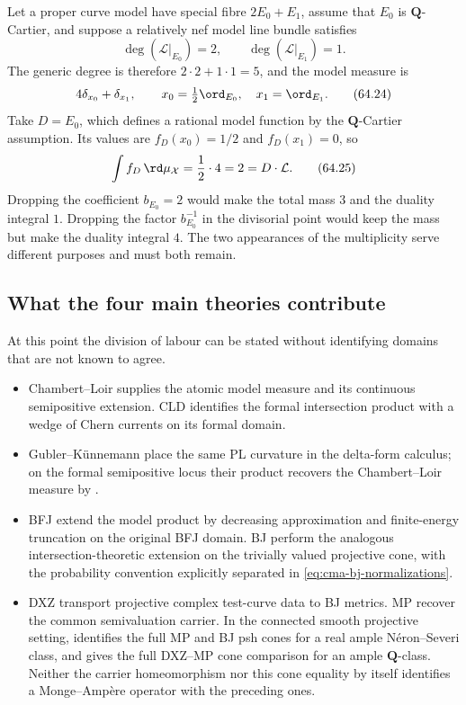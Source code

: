 Let a proper curve model have special fibre $2E_0+E_1$, assume that $E_0$ is $\mathbf Q$-Cartier, and suppose a relatively nef model line bundle satisfies
\[
                  \deg(\mathcal L|_{E_0})=2,
             \qquad
                  \deg(\mathcal L|_{E_1})=1.
\tag{64.23}\label{eq:cma-nonreduced-curve-degrees}
\]
The generic degree is therefore $2\cdot2+1\cdot1=5$, and the model
measure is
\[
                       4\delta_{x_0}+\delta_{x_1},
             \qquad x_0=\tfrac12\ord_{E_0},
                    \quad x_1=\ord_{E_1}.
\tag{64.24}\label{eq:cma-nonreduced-curve-measure}
\]
Take $D=E_0$, which defines a rational model function by the $\mathbf Q$-Cartier assumption. Its values are
$f_D(x_0)=1/2$ and $f_D(x_1)=0$, so
\[
             \int f_D\,\rd\mu_{\mathcal X}
              =\frac12\cdot4=2
              =D\cdot\mathcal L.
\tag{64.25}\label{eq:cma-nonreduced-curve-duality}
\]
Dropping the coefficient $b_{E_0}=2$ would make the total mass $3$
and the duality integral $1$.  Dropping the factor $b_{E_0}^{-1}$ in
the divisorial point would keep the mass but make the duality integral
$4$.  The two appearances of the multiplicity serve different purposes
and must both remain.

\subsection{What the four main theories contribute}
\label{subsec:cma-four-theories}

At this point the division of labour can be stated without identifying
domains that are not known to agree.

\begin{itemize}
\item Chambert--Loir supplies the atomic model measure and its continuous
semipositive extension.  CLD identifies the formal intersection product
with a wedge of Chern currents on its formal domain.

\item Gubler--K\"unnemann place the same PL curvature in the delta-form
calculus; on the formal semipositive locus their product recovers the
Chambert--Loir measure by .

\item BFJ extend the model product by decreasing approximation and
finite-energy truncation on the original BFJ domain.  BJ perform the
analogous intersection-theoretic extension on the trivially valued
projective cone, with the probability convention explicitly separated in
\eqref{eq:cma-bj-normalizations}.

\item DXZ transport projective complex test-curve data to BJ metrics.  MP
recover the common semivaluation carrier.  In the connected smooth
projective setting,  identifies the
full MP and BJ psh cones for a real ample N\'eron--Severi class, and gives
the full DXZ--MP cone comparison for an ample $\mathbf Q$-class.  Neither
the carrier homeomorphism nor this cone equality by itself identifies a
Monge--Amp\`ere operator with the preceding ones.
\end{itemize}

